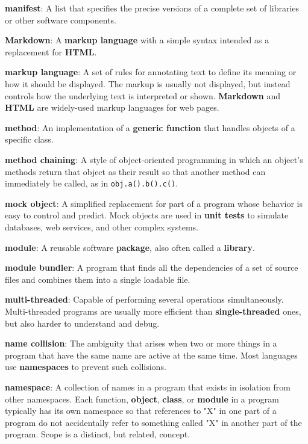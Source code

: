 \documentclass[krantzl]{krantz}
\newcommand{\glosskey}[1]{\textbf{#1}}
\begin{document}
\noindent \textbf{\glosskey{manifest}}: 
A list that specifies the precise versions of a complete set of libraries or other software components.


\noindent \textbf{\glosskey{Markdown}}: 
A \glosskey{markup language} with a simple syntax intended as a replacement for \glosskey{HTML}.


\noindent \textbf{\glosskey{markup language}}: 
A set of rules for annotating text to define its meaning or how it should be displayed. The markup is usually not displayed, but instead controls how the underlying text is interpreted or shown. \glosskey{Markdown} and \glosskey{HTML} are widely-used markup languages for web pages.


\noindent \textbf{\glosskey{method}}: 
An implementation of a \glosskey{generic function} that handles objects of a specific class.


\noindent \textbf{\glosskey{method chaining}}: 
A style of object-oriented programming in which an object's methods return that object as their result so that another method can immediately be called, as in \texttt{obj.a().b().c()}.


\noindent \textbf{\glosskey{mock object}}: 
A simplified replacement for part of a program whose behavior is easy to control and predict. Mock objects are used in \glosskey{unit tests} to simulate databases, web services, and other complex systems.


\noindent \textbf{\glosskey{module}}: 
A reusable software \glosskey{package}, also often called a \glosskey{library}.


\noindent \textbf{\glosskey{module bundler}}: 
A program that finds all the dependencies of a set of source files and combines them into a single loadable file.


\noindent \textbf{\glosskey{multi-threaded}}: 
Capable of performing several operations simultaneously. Multi-threaded programs are usually more efficient than \glosskey{single-threaded} ones, but also harder to understand and debug.


\noindent \textbf{\glosskey{name collision}}: 
The ambiguity that arises when two or more things in a program that have the same name are active at the same time. Most languages use \glosskey{namespaces} to prevent such collisions.


\noindent \textbf{\glosskey{namespace}}: 
A collection of names in a program that exists in isolation from other namespaces. Each function, \glosskey{object}, \glosskey{class}, or \glosskey{module} in a program typically has its own namespace so that references to "X" in one part of a program do not accidentally refer to something called "X" in another part of the program. Scope is a distinct, but related, concept.
\end{document}
